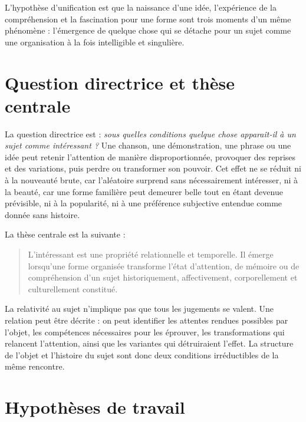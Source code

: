 \documentclass[11pt,a4paper]{article}
\begin{document}
L'hypothèse d'unification est que la naissance d'une idée, l'expérience de la
compréhension et la fascination pour une forme sont trois moments d'un même
phénomène : l'émergence de quelque chose qui se détache pour un sujet comme une
organisation à la fois intelligible et singulière.

\section{Question directrice et thèse centrale}

La question directrice est : \emph{sous quelles conditions quelque chose
apparaît-il à un sujet comme intéressant ?} Une chanson, une démonstration, une
phrase ou une idée peut retenir l'attention de manière disproportionnée, provoquer
des reprises et des variations, puis perdre ou transformer son pouvoir. Cet effet
ne se réduit ni à la nouveauté brute, car l'aléatoire surprend sans nécessairement
intéresser, ni à la beauté, car une forme familière peut demeurer belle tout en
étant devenue prévisible, ni à la popularité, ni à une préférence subjective
entendue comme donnée sans histoire.

La thèse centrale est la suivante :

\begin{quote}
L'intéressant est une propriété relationnelle et temporelle. Il émerge lorsqu'une
forme organisée transforme l'état d'attention, de mémoire ou de compréhension
d'un sujet historiquement, affectivement, corporellement et culturellement
constitué.
\end{quote}

La relativité au sujet n'implique pas que tous les jugements se valent. Une
relation peut être décrite : on peut identifier les attentes rendues possibles
par l'objet, les compétences nécessaires pour les éprouver, les transformations
qui relancent l'attention, ainsi que les variantes qui détruiraient l'effet. La
structure de l'objet et l'histoire du sujet sont donc deux conditions
irréductibles de la même rencontre.

\section{Hypothèses de travail}
\end{document}
